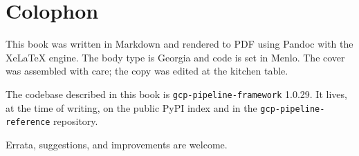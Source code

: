\documentclass[
  11pt,
  british,
  oneside]{book}
\begin{document}
\newpage

\hypertarget{colophon}{%
\chapter{Colophon}\label{colophon}}

This book was written in Markdown and rendered to PDF using Pandoc with
the XeLaTeX engine. The body type is Georgia and code is set in Menlo.
The cover was assembled with care; the copy was edited at the kitchen
table.

The codebase described in this book is \texttt{gcp-pipeline-framework}
1.0.29. It lives, at the time of writing, on the public PyPI index and
in the \texttt{gcp-pipeline-reference} repository.

Errata, suggestions, and improvements are welcome.

\backmatter
\end{document}
